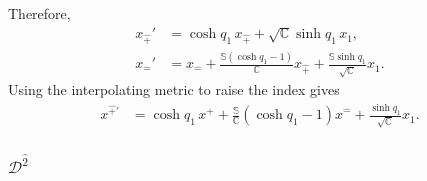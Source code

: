 \documentclass[foundations,article,submit,pdftex,moreauthors]{Definitions/mdpi}
\begin{document}
Therefore,
\begin{align}
x_{\hat{+}}'&=\cosh q_1\,x_{\hat{+}}
 +\sqrt{\mathbb{C}}\sinh q_1\,x_1, \nonumber\\
x_{\hat{-}}'&=x_{\hat{-}}
 +\frac{\mathbb{S}(\cosh q_1-1)}{\mathbb{C}}x_{\hat{+}}
 +\frac{\mathbb{S}\sinh q_1}{\sqrt{\mathbb{C}}}x_1.
\end{align}
Using the interpolating metric to raise the index gives
\begin{align}
x^{\hat{+}\prime}
&=\cosh q_1\,x^{\hat{+}}
 +\frac{\mathbb{S}}{\mathbb{C}}\left(\cosh q_1-1\right)x^{\hat{-}}
 +\frac{\sinh q_1}{\sqrt{\mathbb{C}}}x_1.
\end{align}

\subsubsection{\texorpdfstring{$\mathcal{D}^{\hat{2}}$}{D2}}
\end{document}
